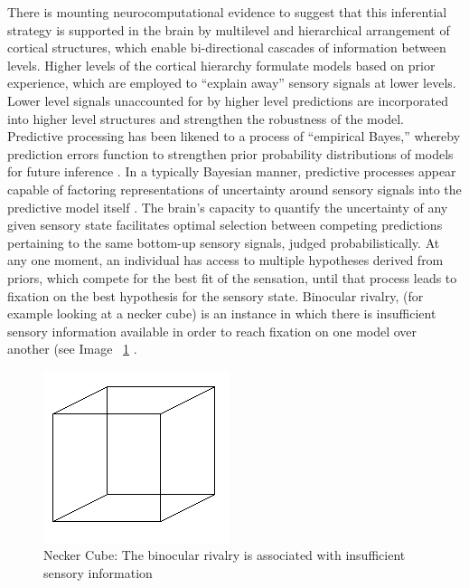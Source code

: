 There is mounting neurocomputational evidence to suggest that this inferential strategy is supported in the brain by multilevel and hierarchical arrangement of cortical structures, which enable bi-directional cascades of information between levels.  Higher levels of the cortical hierarchy formulate models based on prior experience, which are employed to ``explain away'' sensory signals at lower levels. Lower level signals unaccounted for by higher level predictions are incorporated into higher level structures and strengthen the robustness of the model.  Predictive processing has been likened to a process of ``empirical Bayes,'' whereby prediction errors function to strengthen prior probability distributions of models for future inference \citep{Robbins1964}.  In a typically Bayesian manner, predictive processes appear capable of factoring representations of uncertainty around sensory signals into the predictive model itself \citep{Clark2013}.  The brain's capacity to quantify the uncertainty of any given sensory state facilitates optimal selection between competing predictions pertaining to the same bottom-up sensory signals, judged probabilistically.  At any one moment, an individual has access to multiple hypotheses derived from priors, which compete for the best fit of the sensation, until that process leads to fixation on the best hypothesis for the sensory state.
Binocular rivalry, (for example looking at a necker cube) is an instance in which there is insufficient sensory information available in order to reach fixation on one model over another (see Image ~\ref{fig:neckerCube} \citep{Frith2007}.

\begin{figure}[htbp]
  \begin{center}
    \includegraphics{images/Necker_cube.png}
      \caption{Necker Cube: The binocular rivalry is associated with insufficient sensory information}
        \label{fig:neckerCube}
   \end{center}
\end{figure}

